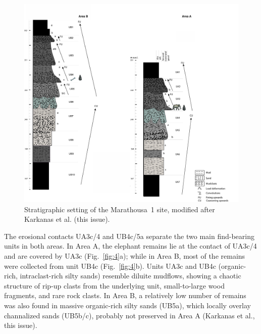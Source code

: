 \documentclass[preprint,authoryear,times]{elsarticle} %
\begin{document}
\begin{figure}[]
  \centering
  \includegraphics[width=1\textwidth]{../artwork/Fig3.pdf}
  \caption{Stratigraphic setting of the Marathousa~1 site, modified after Karkanas et al. (this issue).}
  \label{fig:3}
\end{figure}

The erosional contacts UA3c/4 and UB4c/5a separate the two main find-bearing units in both areas. In Area A, the elephant remains lie at the contact of UA3c/4 and are covered by UA3c (Fig.~\ref{fig:4}a); while in Area B, most of the remains were collected from unit UB4c (Fig.~\ref{fig:4}b). Units UA3c and UB4c (organic-rich, intraclast-rich silty sands) resemble diluite mudflows, showing a chaotic structure of rip-up clasts from the underlying unit, small-to-large wood fragments, and rare rock clasts. In Area B, a relatively low number of remains was also found in massive organic-rich silty sands (UB5a), which locally overlay channalized sands (UB5b/c), probably not preserved in Area A (Karkanas et al., this issue).
\end{document}
